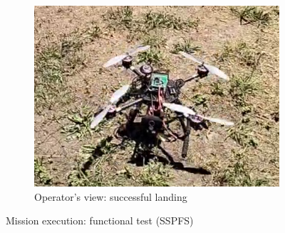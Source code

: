 \begin{figure}[!hbt]
\begin{subfigure}[t]{0.49\textwidth}
    \includegraphics[width=0.92\linewidth]{./img/png/bao-flight-myView-final} %
    \caption{Operator's view: successful landing}%
    \label{fig:mission-exec-sspfs-final}
  \end{subfigure}
%  
  \caption{Mission execution: functional test (SSPFS)}
  \label{fig:mission-exec-sspfs-last}
\end{figure}
  

  
